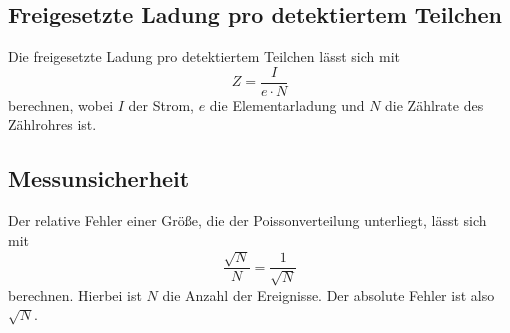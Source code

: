 \subsection{Freigesetzte Ladung pro detektiertem Teilchen}
Die freigesetzte Ladung pro detektiertem Teilchen lässt sich mit
\begin{equation}
    Z = \frac{I}{e \cdot N}
\end{equation}
berechnen, wobei $I$ der Strom, $e$ die Elementarladung und $N$ die Zählrate des Zählrohres ist.
\subsection{Messunsicherheit}
\label{sec:Messunsicherheit}
Der relative Fehler einer Größe, die der Poissonverteilung unterliegt, lässt sich mit
\begin{equation}
    \frac{\sqrt{N}}{N} = \frac{1}{\sqrt{N}}
\end{equation}
berechnen. Hierbei ist $N$ die Anzahl der Ereignisse. Der absolute Fehler ist also $\sqrt{N}$.
